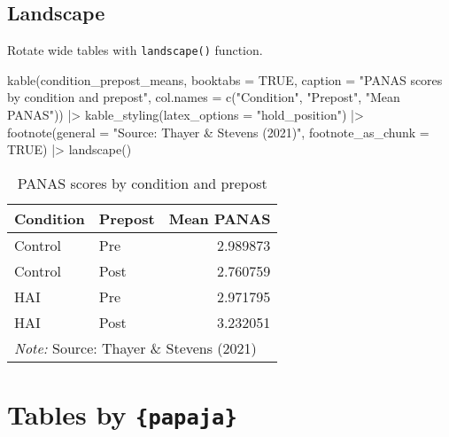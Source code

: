 \documentclass[
  doc]{apa6}
\newenvironment{Shaded}{\begin{snugshade}}{\end{snugshade}}
\newcommand{\AttributeTok}[1]{\textcolor[rgb]{0.77,0.63,0.00}{#1}}
\newcommand{\ConstantTok}[1]{\textcolor[rgb]{0.00,0.00,0.00}{#1}}
\newcommand{\FunctionTok}[1]{\textcolor[rgb]{0.00,0.00,0.00}{#1}}
\newcommand{\NormalTok}[1]{#1}
\newcommand{\SpecialCharTok}[1]{\textcolor[rgb]{0.00,0.00,0.00}{#1}}
\newcommand{\StringTok}[1]{\textcolor[rgb]{0.31,0.60,0.02}{#1}}
\begin{document}
\newpage

\hypertarget{landscape}{%
\subsection{Landscape}\label{landscape}}

Rotate wide tables with \texttt{landscape()} function.

\begin{Shaded}
\begin{Highlighting}[]
\FunctionTok{kable}\NormalTok{(condition\_prepost\_means, }
      \AttributeTok{booktabs =} \ConstantTok{TRUE}\NormalTok{,}
      \AttributeTok{caption =} \StringTok{"PANAS scores by condition and prepost"}\NormalTok{,}
      \AttributeTok{col.names =} \FunctionTok{c}\NormalTok{(}\StringTok{"Condition"}\NormalTok{, }\StringTok{"Prepost"}\NormalTok{, }\StringTok{"Mean PANAS"}\NormalTok{)) }\SpecialCharTok{|\textgreater{}}
  \FunctionTok{kable\_styling}\NormalTok{(}\AttributeTok{latex\_options =} \StringTok{"hold\_position"}\NormalTok{) }\SpecialCharTok{|\textgreater{}}
  \FunctionTok{footnote}\NormalTok{(}\AttributeTok{general =} \StringTok{"Source: Thayer \& Stevens (2021)"}\NormalTok{,}
           \AttributeTok{footnote\_as\_chunk =} \ConstantTok{TRUE}\NormalTok{) }\SpecialCharTok{|\textgreater{}}
  \FunctionTok{landscape}\NormalTok{()}
\end{Highlighting}
\end{Shaded}

\begin{landscape}\begin{table}[!h]

\caption{\label{tab:unnamed-chunk-18}PANAS scores by condition and prepost}
\centering
\begin{tabular}[t]{llr}
\toprule
Condition & Prepost & Mean PANAS\\
\midrule
Control & Pre & 2.989873\\
Control & Post & 2.760759\\
HAI & Pre & 2.971795\\
HAI & Post & 3.232051\\
\bottomrule
\multicolumn{3}{l}{\rule{0pt}{1em}\textit{Note: } Source: Thayer \& Stevens (2021)}\\
\end{tabular}
\end{table}
\end{landscape}

\hypertarget{tables-by-papaja}{%
\section{\texorpdfstring{Tables by \texttt{\{papaja\}}}{Tables by \{papaja\}}}\label{tables-by-papaja}}
\end{document}
